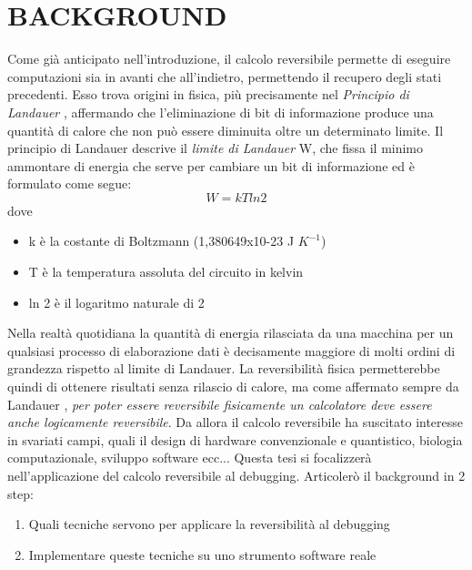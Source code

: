 \documentclass[Tesi.tex]{subfiles}
\begin{document}
\section{BACKGROUND}
Come già anticipato nell'introduzione, il calcolo reversibile permette di eseguire computazioni sia in avanti che all'indietro, permettendo il recupero degli stati precedenti.
Esso trova origini in fisica, più precisamente nel \textit{Principio di Landauer} \cite{landauer}, affermando che l'eliminazione di bit di informazione produce una quantità di calore che non può essere diminuita oltre un determinato limite.
Il principio di Landauer descrive il \textit{limite di Landauer} W, che fissa il minimo ammontare di energia che serve per cambiare un bit di informazione ed è formulato come segue: 
\[
W=kT ln 2
\]
dove
\begin{itemize}
	\item k è la costante di Boltzmann (1,380649x10-23 J $K^{-1}$)
	\item T è la temperatura assoluta del circuito in kelvin
	\item ln 2 è il logaritmo naturale di 2
\end{itemize}
Nella realtà quotidiana la quantità di energia rilasciata da una macchina per un qualsiasi processo di elaborazione dati è decisamente maggiore di molti ordini di grandezza rispetto al limite di Landauer.
La reversibilità fisica permetterebbe quindi di ottenere risultati senza rilascio di calore, ma come affermato sempre da Landauer \cite{wikipedia}, \textit{per poter essere reversibile fisicamente un calcolatore deve essere anche logicamente reversibile}.
Da allora il calcolo reversibile ha suscitato interesse in svariati campi, quali il design di hardware convenzionale e quantistico, biologia computazionale, sviluppo software ecc..\cite{book}.
Questa tesi si focalizzerà nell'applicazione del calcolo reversibile al debugging.
Articolerò il background in 2 step:
\begin{enumerate}
	\item Quali tecniche servono per applicare la reversibilità al debugging
	\item Implementare queste tecniche su uno strumento software reale
\end{enumerate}


\end{document}
